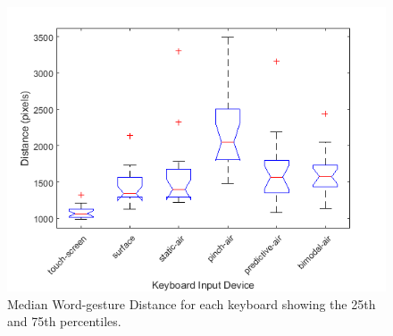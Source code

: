 \begin{figure}[t]
	\centering
	\includegraphics{Figures/fig_distance_boxplot}
	\caption[Word-gesture Distance Boxplot]{Median Word-gesture Distance for each keyboard showing the 25th and 75th percentiles.}
	\label{fig_distance_boxplot}
\end{figure}

